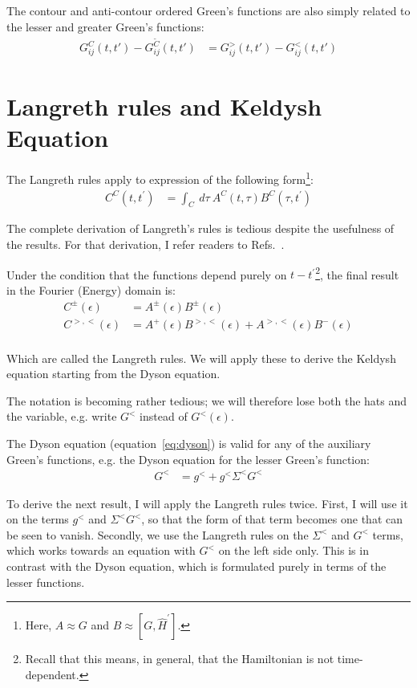 The contour and anti-contour ordered Green's functions are also simply related to the lesser and greater Green's functions:
\begin{align*}
G^C_{ij}(t,t') - G^{\tilde{C}}_{ij}(t,t') &= G^>_{ij}(t,t') - G^<_{ij}(t,t')
\end{align*}

\section{Langreth rules and Keldysh Equation}
The Langreth rules apply to expression of the following form\footnote{Here, $A \approx G$ and $B \approx [G, \widehat{H}^\prime]$.}:
\begin{align*}
C^C(t,t^\prime) &= \int_C\:d\tau\:A^C(t,\tau) B^C (\tau, t^\prime)
\end{align*}

The complete derivation of Langreth's rules is tedious despite the usefulness of the results. For that derivation, I refer readers to Refs.~\cite{mattuck,haugjauho}.
 
Under the condition that the functions depend purely on $t-t^\prime$\footnote{Recall that this means, in general, that the Hamiltonian is not time-dependent.}, the final result in the Fourier (Energy) domain is:
\begin{align*}
C^\pm (\epsilon) &= 
A^\pm (\epsilon) 
B^\pm (\epsilon) \\
C^{>,<} (\epsilon) &= 
A^+ (\epsilon) 
B^{>,<} (\epsilon) + 
A^{>,<} (\epsilon) 
B^- (\epsilon) \\
\end{align*}

Which are called the Langreth rules. We will apply these to derive the Keldysh equation starting from the Dyson equation.
 
The notation is becoming rather tedious; we will therefore lose both the hats and the variable, e.g. write $G^<$ instead of $G^<(\epsilon)$.

The Dyson equation (equation~\ref{eq:dyson}) is valid for any of the auxiliary Green's functions, e.g. the Dyson equation for the lesser Green's function:
\begin{align*}
G^< &= g^< + g^< \Sigma^< G^<  
\end{align*}

To derive the next result, I will apply the Langreth rules twice. First, I will use it on the terms $g^<$ and $\Sigma^< G^<$, so that the form of that term becomes one that can be seen to vanish. Secondly, we use the Langreth rules on the $\Sigma^<$ and $G^<$ terms, which works towards an equation with $G^<$ on the left side only. This is in contrast with the Dyson equation, which is formulated purely in terms of the lesser functions.

